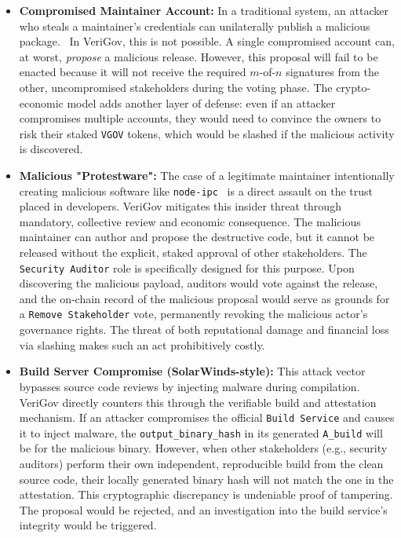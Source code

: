 \documentclass{article}
\begin{document}
\begin{itemize}
\item \textbf{Compromised Maintainer Account:} In a traditional system, an attacker who steals a maintainer's credentials can unilaterally publish a malicious package.~\cite{aikido2025rand} In VeriGov, this is not possible. A single compromised account can, at worst, \emph{propose} a malicious release. However, this proposal will fail to be enacted because it will not receive the required $m$-of-$n$ signatures from the other, uncompromised stakeholders during the voting phase. The crypto-economic model adds another layer of defense: even if an attacker compromises multiple accounts, they would need to convince the owners to risk their staked \lstinline{VGOV} tokens, which would be slashed if the malicious activity is discovered.~\cite{buterin2017casper}
\item \textbf{Malicious "Protestware":} The case of a legitimate maintainer intentionally creating malicious software like \lstinline{node-ipc}~\cite{cve-2022-23812} is a direct assault on the trust placed in developers. VeriGov mitigates this insider threat through mandatory, collective review and economic consequence. The malicious maintainer can author and propose the destructive code, but it cannot be released without the explicit, staked approval of other stakeholders. The \lstinline{Security Auditor} role is specifically designed for this purpose. Upon discovering the malicious payload, auditors would vote against the release, and the on-chain record of the malicious proposal would serve as grounds for a \lstinline{Remove Stakeholder} vote, permanently revoking the malicious actor's governance rights. The threat of both reputational damage and financial loss via slashing makes such an act prohibitively costly.~\cite{buterin2017casper}
\item \textbf{Build Server Compromise (SolarWinds-style):} This attack vector bypasses source code reviews by injecting malware during compilation. VeriGov directly counters this through the verifiable build and attestation mechanism. If an attacker compromises the official \lstinline{Build Service} and causes it to inject malware, the \lstinline{output_binary_hash} in its generated \lstinline{A_build} will be for the malicious binary. However, when other stakeholders (e.g., security auditors) perform their own independent, reproducible build from the clean source code, their locally generated binary hash will not match the one in the attestation. This cryptographic discrepancy is undeniable proof of tampering. The proposal would be rejected, and an investigation into the build service's integrity would be triggered.

\end{itemize}
\end{document}

